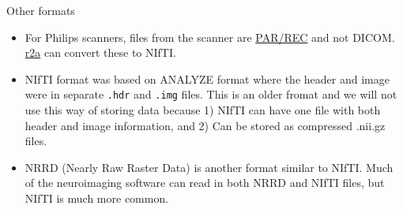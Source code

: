 \documentclass[11pt]{beamer}\usepackage[]{graphicx}\usepackage[]{color}
\begin{document}
\begin{frame}[fragile]{Other formats}

\begin{itemize}
\item For Philips scanners, files from the scanner are \href{http://sourceforge.net/projects/r2agui/}{PAR/REC} and not DICOM.  \href{http://sourceforge.net/projects/r2agui/}{r2a} can convert these to NIfTI. \\

\item NIfTI format was based on ANALYZE format where the header and image were in separate \verb|.hdr| and \verb|.img| files.  This is an older fromat and we will not use this way of storing data because 1) NIfTI can have one file with both header and image information, and 2) Can be stored as compressed .nii.gz files.\\

\item NRRD (Nearly Raw Raster Data) is another format similar to NIfTI.  Much of the neuroimaging software can read in both NRRD and NIfTI files, but NIfTI is much more common.

\end{itemize}
\end{frame}
\end{document}
